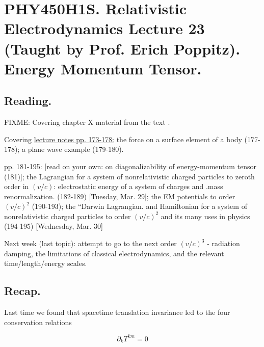 
%

\chapter{PHY450H1S.  Relativistic Electrodynamics Lecture 23 (Taught by Prof. Erich Poppitz).  Energy Momentum Tensor.}
\label{chap:relativisticElectrodynamicsL23}
{}
\date{Mar 29, 2011}

\beginArtNoToc

\section{Reading.}

FIXME:
Covering chapter X material from the text \cite{landau1980classical}.

Covering \href{http://www.physics.utoronto.ca/~poppitz/epoppitz/PHY450_files/RelEMpp166-180.pdf}{lecture notes pp. 173-178:} the force on a surface element of a body (177-178); a plane wave example (179-180).

pp. 181-195: [read on your own: on diagonalizability of energy-momentum tensor (181)]; the Lagrangian for a system of nonrelativistic charged particles to zeroth order in $(v/c)$: electrostatic energy of a system of charges and .mass renormalization. (182-189) [Tuesday, Mar. 29]; the EM potentials to order $(v/c)^2$ (190-193); the ``Darwin Lagrangian.  and Hamiltonian for a system of nonrelativistic charged particles to order $(v/c)^2$ and its many uses in physics (194-195) [Wednesday, Mar. 30]

Next week (last topic): attempt to go to the next order $(v/c)^3$ - radiation damping, the limitations of classical electrodynamics, and the relevant time/length/energy scales.

\section{Recap.}

Last time we found that spacetime translation invariance led to the four conservation relations

\begin{equation}\label{eqn:relativisticElectrodynamicsL23:n}
\partial_k T^{k m} = 0
\end{equation}

